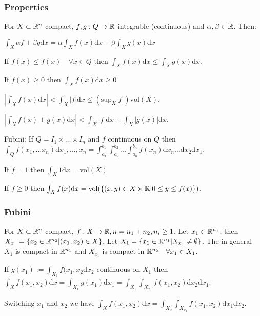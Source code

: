\subsubsection{Properties}
For $X \subset \mathbb{R}^n$ compact, $f, g: Q \to \mathbb{R}$ integrable (continuous) and $\alpha, \beta \in \mathbb{R}$. Then:

\begin{compactitem}
    \item $\int_X \alpha f + \beta g \mathrm{d}x = \alpha \int_X f(x) \mathrm{d}x + \beta \int_X g(x) \mathrm{d}x$
    \item If $f(x) \le f(x) \quad \forall x \in Q$ then $\int_X f(x) \mathrm{d}x \le \int_X g(x) \mathrm{d}x$.
    \item If $f(x) \ge 0$ then $\int_X f(x) \mathrm{d}x \ge 0$
    \item $\left| \int_X f(x) \mathrm{d}x \right| < \int_X |f| \mathrm{d}x \le (\text{sup}_X |f|) \text{vol}(X)$.
    \item $\left| \int_X f(x) + g(x) \mathrm{d}x \right| < \int_X |f| \mathrm{d}x + \int_X | g(x) | \mathrm{d}x$.
    \item Fubini: If $Q = I_1 \times \dots \times I_n$ and $f$ continuous on $Q$ then $\int_{Q} f(x_1, \dots x_n) \mathrm{d}x_1,\dots,x_n = \int_{a_1}^{b_1} \int_{a_2}^{b_2} \dots \int_{a_n}^{b_n} f(x_n) \mathrm{d}x_n \dots \mathrm{d}x_2 \mathrm{d}x_1$.
    \item If $f = 1$ then $\int_X 1 \mathrm{d}x = \text{vol}(X)$
    \item If $f \ge 0$ then $\int_X f(x) \mathrm{d}x = \text{vol}(\{(x, y) \in X \times \mathbb{R} | 0 \le y \le f(x) \})$.
\end{compactitem}

\subsubsection{Fubini}
For $X \subset \mathbb{R}^n$ compact, $f: X \to \mathbb{R}, n = n_1 + n_2, n_i \ge 1$. Let $x_1 \in \mathbb{R}^{n_1}$, then $X_{x_1} = \{x_2 \in \mathbb{R}^{n_2} | (x_1, x_2) \in X\}$. Let $X_1 = \{x_1 \in \mathbb{R}^{n_1} | X_{x_1} \neq \emptyset \}$. The in general $X_1$ is compact in $\mathbb{R}^{n_1}$ and $X_{x_1}$ is compact in $\mathbb{R}^{n_2} \quad \forall x_1 \in X_1$.

If $g(x_1) := \int_{X_1} f(x_1, x_2 \mathrm{d}x_2$ continuous on $X_1$ then $\int_X f(x_1, x_2) \mathrm{d}x = \int_{X_1} g(x_1) \mathrm{d}x_1 = \int_{X_1} \int_{X_{x_1}} f(x_1, x_2) \mathrm{d}x_2 \mathrm{d}x_1$.

Switching $x_1$ and $x_2$ we have 
$\int_X f(x_1, x_2) \mathrm{d}x = \int_{X_2} \int_{X_{x_2}} f(x_1, x_2) \mathrm{d}x_1 \mathrm{d}x_2$.

